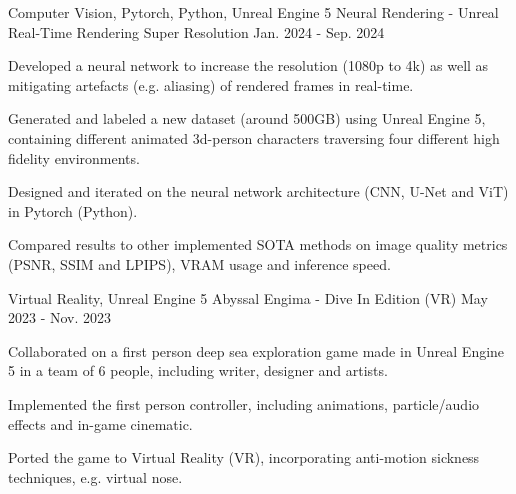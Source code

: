 

\begin{cventries}

  \cventry
    {Computer Vision, Pytorch, Python, Unreal Engine 5} %
    {Neural Rendering - Unreal Real-Time Rendering Super Resolution} %
    {\href{https://github.com/BrandnerKasper/URTSR}{\faGithubSquare}} %
    {Jan. 2024 - Sep. 2024} %
    {
      \begin{cvitems} %
        \item {Developed a neural network to increase the resolution (1080p to 4k) as well as mitigating artefacts (e.g. aliasing) of rendered frames in real-time.}
        \item {Generated and labeled a new dataset (around 500GB) using Unreal Engine 5, containing different animated 3d-person characters traversing four different high fidelity environments.}
        \item {Designed and iterated on the neural network architecture (CNN, U-Net and ViT) in Pytorch (Python).}
        \item {Compared results to other implemented SOTA methods on image quality metrics (PSNR, SSIM and LPIPS), VRAM usage and inference speed.}
      \end{cvitems}
    }

  \cventry
    {Virtual Reality, Unreal Engine 5} %
    {Abyssal Engima - Dive In Edition (VR)} %
    {\href{https://miggli.itch.io/abyssal-enigma}{\faGamepad}} %
    {May 2023 - Nov. 2023} %
    {
      \begin{cvitems} %
        \item {Collaborated on a first person deep sea exploration game made in Unreal Engine 5 in a team of 6 people, including writer, designer and artists.}
        \item {Implemented the first person controller, including animations, particle/audio effects and in-game cinematic.}
        \item {Ported the game to Virtual Reality (VR), incorporating anti-motion sickness techniques, e.g. virtual nose.}
      \end{cvitems}
    }


\end{cventries}
